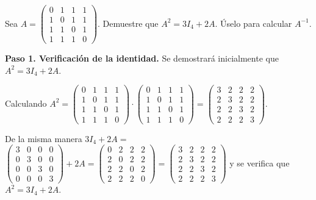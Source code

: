 \begin{prob}
Sea $A=\begin{pmatrix} 0&1&1&1\\1&0&1&1\\1&1&0&1\\1&1&1&0 \end{pmatrix}.$ Demuestre que $A^2=3I_{4}+2A.$ Úselo para calcular $A^{-1}.$

\begin{myproof}
\textbf{Paso 1. Verificación de la identidad.} Se demostrará inicialmente que $A^2 = 3I_4 + 2A.$

Calculando \(
A^2 = \begin{pmatrix}
0 & 1 & 1 & 1 \\
1 & 0 & 1 & 1 \\
1 & 1 & 0 & 1 \\
1 & 1 & 1 & 0
\end{pmatrix} \cdot
\begin{pmatrix}
0 & 1 & 1 & 1 \\
1 & 0 & 1 & 1 \\
1 & 1 & 0 & 1 \\
1 & 1 & 1 & 0
\end{pmatrix} =
\begin{pmatrix}
3 & 2 & 2 & 2 \\
2 & 3 & 2 & 2 \\
2 & 2 & 3 & 2 \\
2 & 2 & 2 & 3
\end{pmatrix}
.\) 


De la misma manera $3I_4 + 2A=$ 
\(\begin{pmatrix}
3 & 0 & 0 & 0 \\
0 & 3 & 0 & 0 \\
0 & 0 & 3 & 0 \\
0 & 0 & 0 & 3
\end{pmatrix} +
2A = \begin{pmatrix}
0 & 2 & 2 & 2 \\
2 & 0 & 2 & 2 \\
2 & 2 & 0 & 2 \\
2 & 2 & 2 & 0
\end{pmatrix} = \begin{pmatrix}
3 & 2 & 2 & 2 \\
2 & 3 & 2 & 2 \\
2 & 2 & 3 & 2 \\
2 & 2 & 2 & 3
\end{pmatrix}
\) y se verifica que $A^2 = 3I_4 + 2A$.


\end{myproof}
\end{prob}
